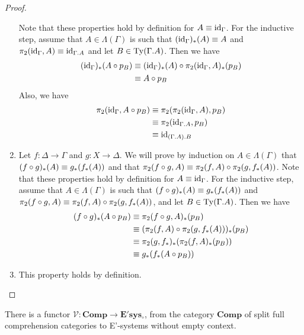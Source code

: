 \begin{proof}
\begin{enumerate}[label=(\alph*)]
Note that these properties hold by definition for $A\equiv{\mathrm{id}_{\Gamma}}$. For the
inductive step, assume that $A\in\Lambda(\Gamma)$ is such that
$({\mathrm{id}_{\Gamma}})_\ast(A)\equiv A$ and $\pi_2(\catid{\Gamma},A)\jdeq
\catid{\ctxext{\Gamma}{A}}$ and let $B\in\mathrm{Ty}(\ctxext{\Gamma}{A})$. Then
we have
\begin{align*}
({\mathrm{id}_{\Gamma}})_\ast(A\circ p_B) & \equiv ({\mathrm{id}_{\Gamma}})_\ast(A)\circ \pi_2({\mathrm{id}_{\Gamma}},A)_\ast(p_B) \\
& \equiv A\circ p_B
\end{align*}
Also, we have
\begin{align*}
\pi_2(\catid{\Gamma},A\circ p_B) & \jdeq \pi_2(\pi_2(\catid{\Gamma},A),p_B) \\
& \jdeq \pi_2(\catid{\ctxext{\Gamma}{A}},p_B) \\
& \jdeq \catid{\ctxext{{\Gamma}{A}}{B}}
\end{align*}
\item Let $f:\Delta\to \Gamma$ and $g:X\to \Delta$. We will prove by induction
on $A\in\Lambda(\Gamma)$ that $(f\circ g)_\ast(A)\equiv g_\ast(f_\ast(A))$ and
that $\pi_2(f\circ g,A)\equiv \pi_2(f,A)\circ \pi_2(g,f_\ast(A))$. Note that
these properties hold by definition for $A\equiv{\mathrm{id}_{\Gamma}}$. For the inductive
step, assume that $A\in\Lambda(\Gamma)$ is such that $(f\circ g)_\ast(A)\equiv g_\ast(f_\ast(A))$ and
$\pi_2(f\circ g,A)\equiv \pi_2(f,A)\circ \pi_2(g,f_\ast(A))$, and let
$B\in\mathrm{Ty}(\ctxext{\Gamma}{A})$. Then we have
\begin{align*}
(f\circ g)_\ast(A\circ p_B) & \equiv \pi_2(f\circ g,A)_\ast(p_B) \\
& \equiv (\pi_2(f,A)\circ\pi_2(g,f_\ast(A)))_\ast(p_B) \\
& \equiv \pi_2(g,f_\ast)_\ast(\pi_2(f,A)_\ast(p_B)) \\
& \equiv g_\ast(f_\ast(A\circ p_B))
\end{align*}
\item This property holds by definition.\qedhere
\end{enumerate}
\end{proof}

\begin{defn}
There is a functor $\mathcal{V}:\mathbf{Comp}\to\mathbf{E'sys_{\circ}}$, from
the category $\mathbf{Comp}$ of split full comprehension categories to
E'-systems without empty context.
\end{defn}

